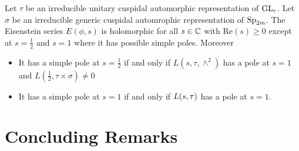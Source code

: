     \begin{Theorem}
        Let \(\tau\) be an irreducible unitary cuspidal automorphic representation of \(\operatorname{GL}_r\). Let \(\sigma\) be an irreducible generic cuspidal automrophic representation of \(\operatorname{Sp}_{2m}\). The Eisenstein series \(E(\phi, s)\) is holomorphic for all \(s\in \C\) with \(\mathrm{Re}(s)\geq 0\) except at \(s = \frac{1}{2}\) and \(s= 1\) where it has possible simple poles. Moreover 
       	\begin{itemize}
       		\item It has a simple pole at \(s= \frac{1}{2}\) if and only if \(L(s, \tau, \wedge^2)\) has a pole at \(s=1\) and \(L(\frac{1}{2}, \tau\times \sigma)\neq 0\)
       		\item It has a simple pole at \(s=1\) if and only if \(L(s, \tau\time \sigma)\) has a pole at \(s=1\).
       	\end{itemize}
    \end{Theorem}
    
\section{Concluding Remarks}


     